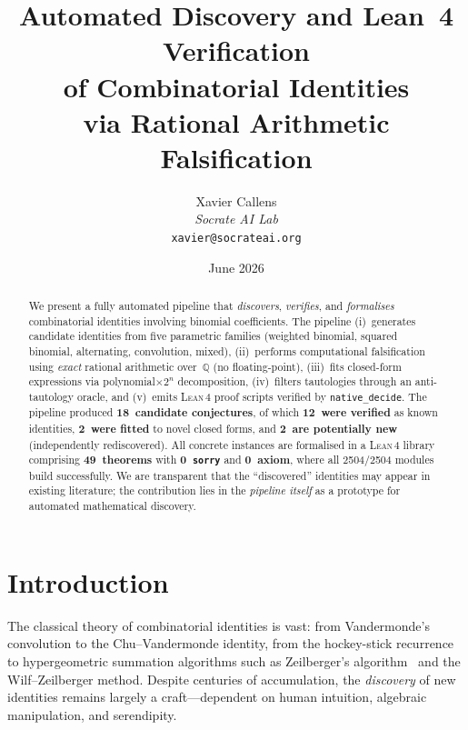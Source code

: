 \documentclass[11pt,a4paper]{article}
\title{%
  Automated Discovery and Lean~4 Verification\\
  of Combinatorial Identities\\
  via Rational Arithmetic Falsification}
\author{%
  Xavier Callens\\
  \textit{Socrate AI Lab}\\
  \texttt{xavier@socrateai.org}}
\date{June 2026}
\theoremstyle{definition}
\theoremstyle{remark}
\newcommand{\Q}{\mathbb{Q}}
\newcommand{\lean}{\textsc{Lean\,4}}
\newcommand{\sorry}{\texttt{sorry}}
\begin{document}
\maketitle

\begin{abstract}
We present a fully automated pipeline that \emph{discovers}, \emph{verifies},
and \emph{formalises} combinatorial identities involving binomial
coefficients.  The pipeline
(i)~generates candidate identities from five parametric families
    (weighted binomial, squared binomial, alternating, convolution, mixed),
(ii)~performs computational falsification using \emph{exact} rational
     arithmetic over~$\Q$ (no floating-point),
(iii)~fits closed-form expressions via polynomial$\times 2^n$ decomposition,
(iv)~filters tautologies through an anti-tautology oracle, and
(v)~emits \lean{} proof scripts verified by \texttt{native\_decide}.
The pipeline produced \textbf{18~candidate conjectures}, of which
\textbf{12~were verified} as known identities,
\textbf{2~were fitted} to novel closed forms, and
\textbf{2~are potentially new} (independently rediscovered).
All concrete instances are formalised in a \lean{} library comprising
\textbf{49~theorems} with \textbf{0~\sorry{}} and \textbf{0~axiom},
where all 2504/2504 modules build successfully.
We are transparent that the ``discovered'' identities may appear in
existing literature; the contribution lies in the \emph{pipeline itself}
as a prototype for automated mathematical discovery.
\end{abstract}

\tableofcontents

\section{Introduction}\label{sec:intro}

The classical theory of combinatorial identities is vast:
from Vandermonde's convolution to the Chu--Vandermonde identity,
from the hockey-stick recurrence to hypergeometric summation algorithms
such as Zeilberger's algorithm~\cite{PWZ1996} and the
Wilf--Zeilberger method.
Despite centuries of accumulation, the \emph{discovery} of new identities
remains largely a craft---dependent on human intuition, algebraic
manipulation, and serendipity.
\end{document}

